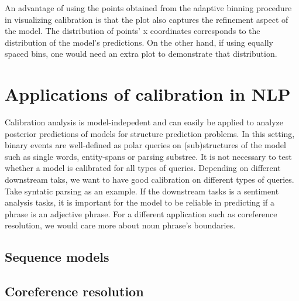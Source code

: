 An advantage of using the points obtained from the adaptive binning procedure in visualizing calibration is that the plot also captures the refinement aspect of the model. The distribution of points' x coordinates corresponds to the distribution of the model's predictions. On the other hand, if using equally spaced bins, one would need an extra plot to demonstrate that distribution. 

\section{Applications of calibration in NLP}

Calibration analysis is model-indepedent and can easily be applied to analyze posterior predictions of models for structure prediction problems. In this setting, binary events are well-defined as polar queries on (sub)structures of the model such as single words, entity-spans or parsing substree. It is not necessary to test whether a model is calibrated for all types of queries. Depending on different downstream taks, we want to have good calibration on different types of queries. Take syntatic parsing as an example. If the downstream tasks is a sentiment analysis tasks, it is important for the model to be reliable in predicting if a phrase is an adjective phrase. For a different application such as coreference resolution, we would care more about noun phrase's boundaries.

\subsection{Sequence models}


\subsection{Coreference resolution}



